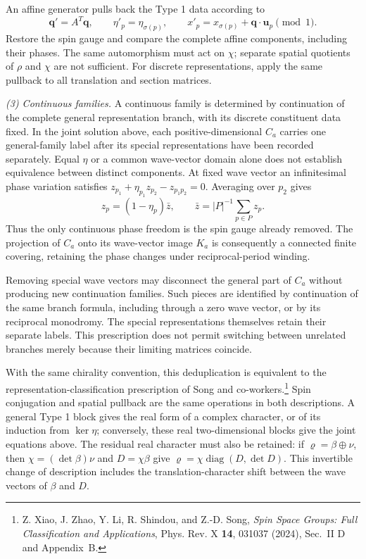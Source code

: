 \documentclass{article}
\begin{document}
An affine generator pulls back the Type 1 data according to
\[
 \bm q'=A^T\bm q,\qquad
 \eta'_p=\eta_{\sigma(p)},\qquad
 x'_p=x_{\sigma(p)}+\bm q\cdot\bm u_p\pmod1.
\]
Restore the spin gauge and compare the complete affine components,
including their phases. The same automorphism must act on $\chi$;
separate spatial quotients of $\rho$ and $\chi$ are not sufficient.
For discrete representations, apply the same pullback to all
translation and section matrices.

\textit{(3) Continuous families.}
A continuous family is determined by continuation of the complete
general representation branch, with its discrete constituent data
fixed. In the joint solution above, each positive-dimensional $C_a$
carries one general-family label after its special representations
have been recorded separately. Equal $\eta$ or a common wave-vector
domain alone does not establish equivalence between distinct
components. At fixed wave vector an infinitesimal phase variation
satisfies $z_{p_1}+\eta_{p_1}z_{p_2}-z_{p_1p_2}=0$. Averaging over
$p_2$ gives
\[
 z_p=(1-\eta_p)\bar z,\qquad
 \bar z=|P|^{-1}\sum_{p\in P}z_p.
\]
Thus the only continuous phase freedom is the spin gauge already
removed. The projection of $C_a$ onto its wave-vector image $K_a$
is consequently a connected finite covering, retaining the phase
changes under reciprocal-period winding.

Removing special wave vectors may disconnect the general part of
$C_a$ without producing new continuation families. Such pieces are
identified by continuation of the same branch formula, including
through a zero wave vector, or by its reciprocal monodromy. The
special representations themselves retain their separate labels.
This prescription does not permit switching between unrelated
branches merely because their limiting matrices coincide.

With the same chirality convention, this deduplication is equivalent
to the representation-classification prescription of Song and
co-workers.\footnote{Z. Xiao, J. Zhao, Y. Li, R. Shindou, and
Z.-D. Song, \textit{Spin Space Groups: Full Classification and
Applications}, Phys. Rev. X \textbf{14}, 031037 (2024), Sec.~II D
and Appendix~B.}
Spin conjugation and spatial pullback are the same operations in
both descriptions. A general Type 1 block gives the real form of a
complex character, or of its induction from $\ker\eta$; conversely,
these real two-dimensional blocks give the joint equations above.
The residual real character must also be retained: if
$\varrho=\beta\oplus\nu$, then
$\chi=(\det\beta)\nu$ and $D=\chi\beta$ give
$\varrho=\chi\operatorname{diag}(D,\det D)$.
This invertible change of description includes the translation-character
shift between the wave vectors of $\beta$ and $D$.
\end{document}
